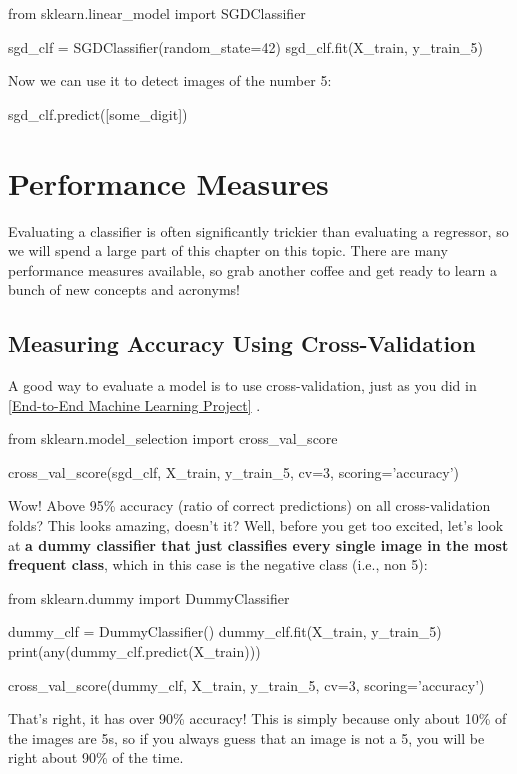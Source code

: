 \begin{pyc}
from sklearn.linear_model import SGDClassifier

sgd_clf = SGDClassifier(random_state=42)
sgd_clf.fit(X_train, y_train_5)
\end{pyc}
Now we can use it to detect images of the number 5:
\begin{pyc}
sgd_clf.predict([some_digit])
\end{pyc}
\section{Performance Measures}
Evaluating a classifier is often significantly trickier than evaluating a regressor, so we will spend a large part of this chapter on this topic. There are many performance measures available, so grab another coffee and get ready to learn a bunch of new concepts and acronyms!
\subsection{Measuring Accuracy Using Cross-Validation}
A good way to evaluate a model is to use cross-validation, just as you did in \autoref{End-to-End Machine Learning Project} .
\begin{pyc}
from sklearn.model_selection import cross_val_score

cross_val_score(sgd_clf, X_train, y_train_5, cv=3, scoring='accuracy')
\end{pyc}

Wow! Above 95\% accuracy (ratio of correct predictions) on all cross-validation folds? This looks amazing, doesn't it? Well, before you get too excited, let's look at \textbf{a dummy classifier that just classifies every single image in the most frequent class}, which in this case is the negative class (i.e., non 5):

\begin{pyc}
from sklearn.dummy import DummyClassifier

dummy_clf = DummyClassifier()
dummy_clf.fit(X_train, y_train_5)
print(any(dummy_clf.predict(X_train)))

cross_val_score(dummy_clf, X_train, y_train_5, cv=3, scoring='accuracy')
\end{pyc}

That's right, it has over 90\% accuracy! This is simply because only about 10\% of the images are 5s, so if you always guess that an image is not a 5, you will be right about 90\% of the time. 

